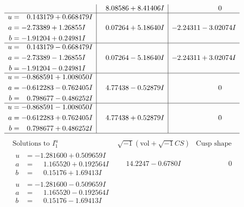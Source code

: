 \documentclass[1p]{elsarticle_modified}
\theoremstyle{definition}
\newcommand{\I}{\sqrt{-1}}
\begin{document}
$$\begin{array}{c|c|c}
 & \phantom{-}8.08586 + 8.41406 I & \phantom{-0.000000 } 0 \\ \hline\begin{aligned}
u &= \phantom{-}0.143179 + 0.668479 I \\
a &= -2.73389 + 1.26855 I \\
b &= -1.91204 + 0.24981 I\end{aligned}
 & \phantom{-}0.07264 + 5.18640 I & -2.24311 - 3.02074 I \\ \hline\begin{aligned}
u &= \phantom{-}0.143179 - 0.668479 I \\
a &= -2.73389 - 1.26855 I \\
b &= -1.91204 - 0.24981 I\end{aligned}
 & \phantom{-}0.07264 - 5.18640 I & -2.24311 + 3.02074 I \\ \hline\begin{aligned}
u &= -0.868591 + 1.008050 I \\
a &= -0.612283 - 0.762405 I \\
b &= \phantom{-}0.798677 - 0.486252 I\end{aligned}
 & \phantom{-}4.77438 - 0.52879 I & \phantom{-0.000000 } 0 \\ \hline\begin{aligned}
u &= -0.868591 - 1.008050 I \\
a &= -0.612283 + 0.762405 I \\
b &= \phantom{-}0.798677 + 0.486252 I\end{aligned}
 & \phantom{-}4.77438 + 0.52879 I & \phantom{-0.000000 } 0\\
 \hline 
 \end{array}$$\newpage$$\begin{array}{c|c|c}  
\text{Solutions to }I^u_{1}& \I (\text{vol} + \sqrt{-1}CS) & \text{Cusp shape}\\
 \hline 
\begin{aligned}
u &= -1.281600 + 0.509659 I \\
a &= \phantom{-}1.165520 + 0.192564 I \\
b &= \phantom{-}0.15176 + 1.69413 I\end{aligned}
 & \phantom{-}14.2247 - 0.6780 I & \phantom{-0.000000 } 0 \\ \hline\begin{aligned}
u &= -1.281600 - 0.509659 I \\
a &= \phantom{-}1.165520 - 0.192564 I \\
b &= \phantom{-}0.15176 - 1.69413 I\end{aligned}

\end{array}$$
\end{document}
